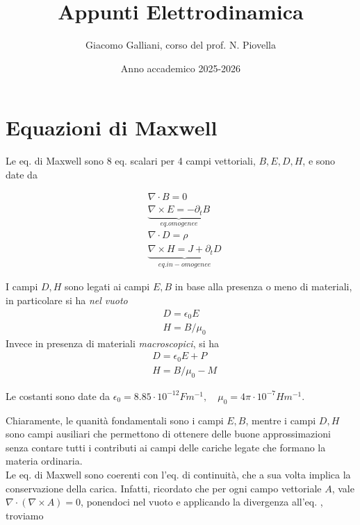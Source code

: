 \documentclass{report}
\title{\Huge{Appunti Elettrodinamica}}
\author{Giacomo Galliani, corso del prof. N. Piovella}
\date{Anno accademico 2025-2026}
\renewcommand{\contentsname}{Indice}
\begin{document}
\maketitle
\newpage%
\pdfbookmark[section]{\contentsname}{toc}
\tableofcontents
\pagebreak

\chapter{Equazioni di Maxwell}

Le eq. di Maxwell sono 8 eq. scalari per 4 campi vettoriali, $B, E, D, H$, e sono date da 

\begin{align}
    & \nabla \cdot B = 0 \\
    & \underbrace{\nabla \times E = -\partial_t B}_{eq. omogenee} \\
    & \nabla \cdot D = \rho \\
    & \underbrace{\nabla \times H = J + \partial_t D}_{eq. in-omogenee}
\end{align}

I campi $D, H$ sono legati ai campi $E, B$ in base alla presenza o meno di materiali, in particolare si ha \emph{nel vuoto}
\begin{align}
    & D = \epsilon_0 E \\
    & H = B /\mu_0
\end{align}
Invece in presenza di materiali \emph{macroscopici}, si ha
\begin{align}
    & D = \epsilon_0 E + P \\
    & H = B /\mu_0 - M
\end{align}

Le costanti sono date da $\epsilon_0 = 8.85 \cdot 10^{-12}F m^{-1},  \quad \mu_{0} = 4\pi \cdot 10^{-7} Hm^{-1}$. 

Chiaramente, le quanità fondamentali sono i campi $E, B$, mentre i campi $D, H$ sono campi ausiliari che permettono di ottenere delle buone approssimazioni senza contare tutti i contributi ai campi delle cariche legate che formano la materia ordinaria. \\

Le eq. di Maxwell sono coerenti con l'eq. di continuità, che a sua volta implica la conservazione della carica. Infatti, ricordato che per ogni campo vettoriale $A$, vale $\nabla \cdot (\nabla \times A ) = 0$, ponendoci nel vuoto e applicando la divergenza all'eq. , troviamo 
\end{document}
